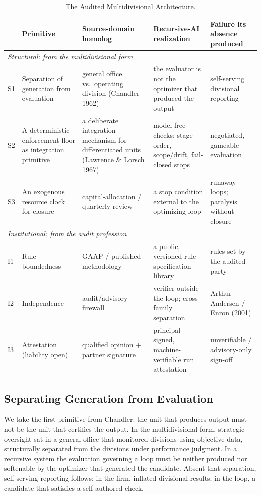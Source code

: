 \documentclass[11pt]{article}
\begin{document}
\begin{table}[ht]
\centering
\footnotesize
\setlength{\tabcolsep}{4pt}
\renewcommand{\arraystretch}{1.25}
\caption{The Audited Multidivisional Architecture.}
\begin{tabular}{p{1.4cm}p{2.7cm}p{2.9cm}p{3.0cm}p{2.9cm}}
\toprule
 & Primitive & Source-domain homolog & Recursive-AI realization & Failure its absence produced \\
\midrule
\multicolumn{5}{l}{\emph{Structural: from the multidivisional form}} \\
\midrule
S1 & Separation of generation from evaluation & general office vs.\ operating division (Chandler 1962) & the evaluator is not the optimizer that produced the output & self-serving divisional reporting \\
S2 & A deterministic enforcement floor as integration primitive & a deliberate integration mechanism for differentiated units (Lawrence \& Lorsch 1967) & model-free checks: stage order, scope/drift, fail-closed stops & negotiated, gameable evaluation \\
S3 & An exogenous resource clock for closure & capital-allocation / quarterly review & a stop condition external to the optimizing loop & runaway loops; paralysis without closure \\
\midrule
\multicolumn{5}{l}{\emph{Institutional: from the audit profession}} \\
\midrule
I1 & Rule-boundedness & GAAP / published methodology & a public, versioned rule-specification library & rules set by the audited party \\
I2 & Independence & audit/advisory firewall & verifier outside the loop; cross-family separation & Arthur Andersen / Enron (2001) \\
I3 & Attestation (liability open) & qualified opinion + partner signature & principal-signed, machine-verifiable run attestation & unverifiable / advisory-only sign-off \\
\bottomrule
\end{tabular}
\end{table}

\subsection{Separating Generation from Evaluation}

We take the first primitive from Chandler: the unit that produces output must not be the unit that certifies the output. In the multidivisional form, strategic oversight sat in a general office that monitored divisions using objective data, structurally separated from the divisions under performance judgment. In a recursive system the evaluation governing a loop must be neither produced nor softenable by the optimizer that generated the candidate. Absent that separation, self-serving reporting follows: in the firm, inflated divisional results; in the loop, a candidate that satisfies a self-authored check.
\end{document}
